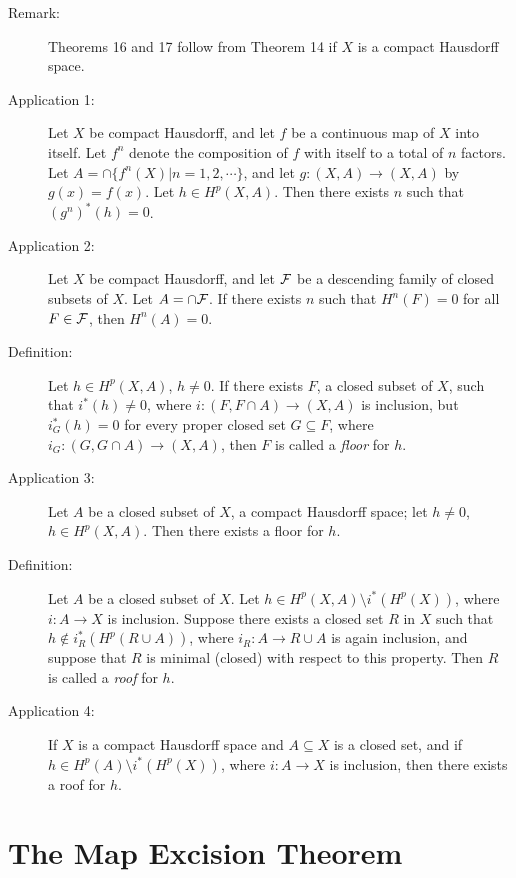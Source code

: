 \documentclass{article}
\begin{document}
\begin{description}
\item[Remark:] Theorems 16 and 17 follow from Theorem 14 if $X$ is a compact Hausdorff space.

\item[Application 1:] Let $X$ be compact Hausdorff, and let $f$ be a continuous map of $X$ into itself. Let $f^n$ denote the composition of $f$ with itself to a total of $n$ factors. Let $A= \cap \{ f^n(X) \vert n = 1,2,\cdots \}$, and let $g: (X,A) \longrightarrow (X,A)$ by $g(x)=f(x)$. Let $h \in H^p(X,A)$. Then there exists $n$ such that $(g^n)^*(h)=0$.

\item[Application 2:] Let $X$ be compact Hausdorff, and let ${\cal F}$ be a descending family of closed subsets of $X$. Let $A = \cap {\cal F}$. If there exists $n$ such that $H^n(F)=0$ for all $F \in {\cal F}$, then $H^n(A)=0$.

\item[Definition:] Let $h \in H^p(X,A)$, $h \neq 0$. If there exists $F$, a closed subset of $X$, such that $i^*(h) \neq 0$, where $i: (F, F \cap A) \rightarrow (X,A)$ is inclusion, but $i_G^*(h)=0$ for every proper closed set $G \subseteq F$, where $i_G: (G, G \cap A) \rightarrow (X,A)$, then $F$ is called a \emph{floor} for $h$.

\item[Application 3:] Let $A$ be a closed subset of $X$, a compact Hausdorff space; let $h \neq 0$, $h \in H^p(X,A)$. Then there exists a floor for $h$.

\item[Definition:] Let $A$ be a closed subset of $X$. Let $h \in H^p(X,A) \setminus i^*(H^p(X))$, where $i: A \rightarrow X$ is inclusion. Suppose there exists a closed set $R$ in $X$ such that $h \notin i_R^*(H^p(R \cup A))$, where $i_R: A \rightarrow R \cup A$ is again inclusion, and suppose that $R$ is minimal (closed) with respect to this property. Then $R$ is called a \emph{roof} for $h$.

\item[Application 4:] If $X$ is a compact Hausdorff space and $A \subseteq X$ is a closed set, and if $h \in H^p(A) \setminus i^*(H^p(X))$, where $i: A \rightarrow X$ is inclusion, then there exists a roof for $h$.

\end{description}



\section{The Map Excision Theorem}
\end{document}
